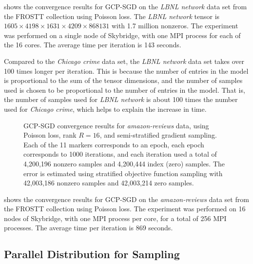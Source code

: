  shows the convergence results for GCP-SGD on the \emph{LBNL network} data set from the FROSTT \cite{FROSTT} collection using Poisson loss.
The \emph{LBNL network} tensor is $1605 \times 4198 \times 1631 \times 4209 \times 868131 $ with 1.7 million nonzeros.
The experiment was performed on a single node of Skybridge, with one MPI process for each of the 16 cores.
The average time per iteration is 143 seconds.

Compared to the \emph{Chicago crime} data set, the \emph{LBNL network} data set takes over 100 times longer per iteration.
This is because the number of entries in the model is proportional to the sum of the tensor dimensions, and the number of samples used is chosen to be proportional to the number of entries in the model.
That is, the number of samples used for \emph{LBNL network} is about 100 times the number used for \emph{Chicago crime}, which helps to explain the increase in time.

\begin{figure}
\renewcommand{\datafile}{data/convergence/amazon_conv.dat}
\centering
{}
\caption[GCP-SGD convergence for \emph{amazon-reviews} tensor]{GCP-SGD convergence results for \emph{amazon-reviews} data, using Poisson loss, rank $R=16$, and semi-stratified gradient sampling.  Each of the 11 markers corresponds to an epoch, each epoch corresponds to 1000 iterations, and each iteration used a total of 4{,}200{,}196 nonzero samples and 4{,}200{,}444 index (zero) samples.  The error is estimated using stratified objective function sampling with 42{,}003{,}186 nonzero samples and 42{,}003{,}214 zero samples.}
\label{fig:amazon_conv}
\end{figure}


 shows the convergence results for GCP-SGD on the \emph{amazon-reviews} data set from the FROSTT \cite{FROSTT} collection using Poisson loss.
The experiment was performed on 16 nodes of Skybridge, with one MPI process per core, for a total of 256 MPI processes.
The average time per iteration is 869 seconds.

\subsection{Parallel Distribution for Sampling}

